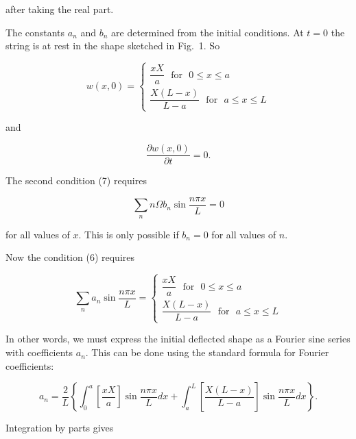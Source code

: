   \noindent{}after taking the real part. 

  The constants $a_n$ and $b_n$ are determined from the initial conditions. At 
  $t=0$ the string is at rest in the shape sketched in Fig.\ 1. So 

  \begin{equation*}w(x,0) = \left\{ \begin{array}{ll} \dfrac{xX}{a} 
  \mathrm{~~~for~~~} 0\le x\le a \\ \dfrac{X(L-x)}{L-a} \mathrm{~~~for~~~} a\le 
  x\le L \end{array} \right. \tag{6}\end{equation*} 

  \noindent{}and 

  \begin{equation*}\dfrac{\partial w(x,0)}{\partial t}=0 . 
  \tag{7}\end{equation*} 

  The second condition (7) requires 

  \begin{equation*}\sum_n{n \Omega b_n \sin\dfrac{n \pi x}{L}}=0 
  \tag{8}\end{equation*} 

  \noindent{}for all values of $x$. This is only possible if $b_n=0$ for all 
  values of $n$. 

  Now the condition (6) requires 

  \begin{equation*} \sum_n{a_n \sin \dfrac{n \pi x}{L}} = \left\{ 
  \begin{array}{ll} \dfrac{xX}{a} \mathrm{~~~for~~~} 0\le x\le a \\ 
  \dfrac{X(L-x)}{L-a} \mathrm{~~~for~~~} a\le x\le L \end{array} \right. 
  \tag{9}\end{equation*} 

  In other words, we must express the initial deflected shape as a Fourier sine 
  series with coefficients $a_n$. This can be done using the standard formula 
  for Fourier coefficients: 

  \begin{equation*}a_n= \dfrac{2}{L} \left\lbrace \int_0^a{ \left[ 
  \dfrac{xX}{a} \right] \sin \dfrac{n \pi x}{L} dx } + \int_a^L{\left[ 
  \dfrac{X(L-x)}{L-a} \right] \sin \dfrac{n \pi x}{L} dx } \right\rbrace . 
  \tag{10}\end{equation*} 

  Integration by parts gives 

